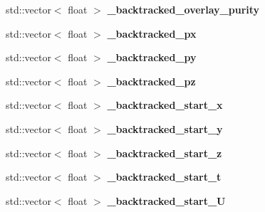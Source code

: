 \begin{DoxyCompactItemize}
\item 
std\+::vector$<$ float $>$ {\bfseries \+\_\+backtracked\+\_\+overlay\+\_\+purity}\hypertarget{classanalysis_1_1DefaultAnalysis_a29bf0fc0be5e2beffdacad2ff2e2285e}{}\label{classanalysis_1_1DefaultAnalysis_a29bf0fc0be5e2beffdacad2ff2e2285e}

\item 
std\+::vector$<$ float $>$ {\bfseries \+\_\+backtracked\+\_\+px}\hypertarget{classanalysis_1_1DefaultAnalysis_a047ee0f1b72f5335030480bc685dea5a}{}\label{classanalysis_1_1DefaultAnalysis_a047ee0f1b72f5335030480bc685dea5a}

\item 
std\+::vector$<$ float $>$ {\bfseries \+\_\+backtracked\+\_\+py}\hypertarget{classanalysis_1_1DefaultAnalysis_a40680f9d1dbeba13fc5064ad92641412}{}\label{classanalysis_1_1DefaultAnalysis_a40680f9d1dbeba13fc5064ad92641412}

\item 
std\+::vector$<$ float $>$ {\bfseries \+\_\+backtracked\+\_\+pz}\hypertarget{classanalysis_1_1DefaultAnalysis_a60378effd0cfb18d7ef31a02685c3e47}{}\label{classanalysis_1_1DefaultAnalysis_a60378effd0cfb18d7ef31a02685c3e47}

\item 
std\+::vector$<$ float $>$ {\bfseries \+\_\+backtracked\+\_\+start\+\_\+x}\hypertarget{classanalysis_1_1DefaultAnalysis_a3b1f942ad3903e2af60ec228dcf40562}{}\label{classanalysis_1_1DefaultAnalysis_a3b1f942ad3903e2af60ec228dcf40562}

\item 
std\+::vector$<$ float $>$ {\bfseries \+\_\+backtracked\+\_\+start\+\_\+y}\hypertarget{classanalysis_1_1DefaultAnalysis_ad70732ed1e83c9a482c76e0d527d8d5e}{}\label{classanalysis_1_1DefaultAnalysis_ad70732ed1e83c9a482c76e0d527d8d5e}

\item 
std\+::vector$<$ float $>$ {\bfseries \+\_\+backtracked\+\_\+start\+\_\+z}\hypertarget{classanalysis_1_1DefaultAnalysis_ae0a88003f3ed610e01708a430eb430be}{}\label{classanalysis_1_1DefaultAnalysis_ae0a88003f3ed610e01708a430eb430be}

\item 
std\+::vector$<$ float $>$ {\bfseries \+\_\+backtracked\+\_\+start\+\_\+t}\hypertarget{classanalysis_1_1DefaultAnalysis_a5a4b93cc8f2a140221f018c38794648d}{}\label{classanalysis_1_1DefaultAnalysis_a5a4b93cc8f2a140221f018c38794648d}

\item 
std\+::vector$<$ float $>$ {\bfseries \+\_\+backtracked\+\_\+start\+\_\+U}\hypertarget{classanalysis_1_1DefaultAnalysis_a40abe0a8f6a9082976df2e44657fd102}{}\label{classanalysis_1_1DefaultAnalysis_a40abe0a8f6a9082976df2e44657fd102}


\end{DoxyCompactItemize}
